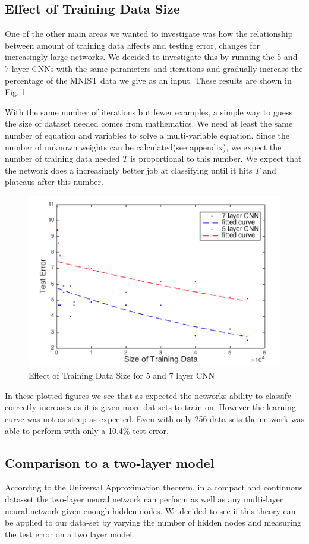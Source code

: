 \documentclass[12pt, twocolumn]{article}
\begin{document}
\subsection{Effect of Training Data Size}
One of the other main areas we wanted to investigate was how the relationship between amount of training data affects and testing error, changes for increasingly large networks. We decided to investigate this by running the 5 and 7 layer CNNs with the same parameters and iterations and gradually increase the percentage of the MNIST data we give as an input. These results are shown in Fig. \ref{fig:trainsize}.  

With the same number of iterations but fewer examples, a simple way to guess the size of dataset needed comes from mathematics.  We need at least the same number of equation and variables to solve a multi-variable equation. Since the number of unknown weights can be calculated(see appendix), we expect the number of training data needed $T$ is proportional to this number. We expect that the network does a increasingly better job at classifying until it hits $T$ and plateaus after this number.

\begin{figure}
\includegraphics[scale=.5]{trainingsize.png}
\caption{Effect of Training Data Size for 5 and 7 layer CNN}
\label{fig:trainsize}
\end{figure}


In these plotted figures we see that as expected the networks ability to classify correctly increases as it is given more dat-sets to train on. However the learning curve was not as steep as expected. Even with only 256 data-sets the network was able to perform with only a 10.4\% test error.

\subsection{Comparison to a two-layer model}
According to the Universal Approximation theorem, in a compact and continuous data-set the two-layer neural network can perform as well as any multi-layer neural network given enough hidden nodes. We decided to see if this theory can be applied to our data-set by varying the number of hidden nodes and measuring the test error on a two layer model.
 
\end{document}
